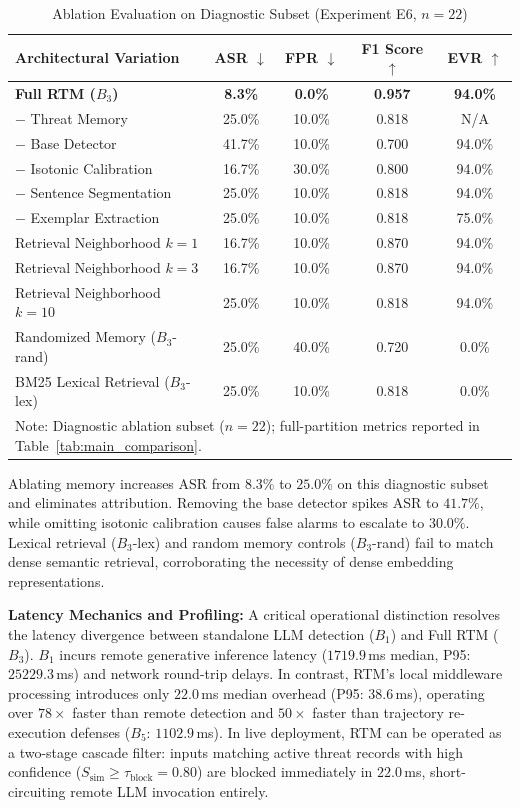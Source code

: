 \documentclass[conference]{IEEEtran}
\begin{document}
\begin{table}[t]
\centering
\caption{Ablation Evaluation on Diagnostic Subset (Experiment E6, $n=22$)}
\label{tab:ablation}
\begin{tabular}{l c c c c}
\hline
\textbf{Architectural Variation} & \textbf{ASR} $\downarrow$ & \textbf{FPR} $\downarrow$ & \textbf{F1 Score} $\uparrow$ & \textbf{EVR} $\uparrow$ \\
\hline
\textbf{Full RTM ($B_3$)} & \textbf{8.3\%} & \textbf{0.0\%} & \textbf{0.957} & \textbf{94.0\%} \\
$-$ Threat Memory & 25.0\% & 10.0\% & 0.818 & N/A \\
$-$ Base Detector & 41.7\% & 10.0\% & 0.700 & 94.0\% \\
$-$ Isotonic Calibration & 16.7\% & 30.0\% & 0.800 & 94.0\% \\
$-$ Sentence Segmentation & 25.0\% & 10.0\% & 0.818 & 94.0\% \\
$-$ Exemplar Extraction & 25.0\% & 10.0\% & 0.818 & 75.0\% \\
Retrieval Neighborhood $k=1$ & 16.7\% & 10.0\% & 0.870 & 94.0\% \\
Retrieval Neighborhood $k=3$ & 16.7\% & 10.0\% & 0.870 & 94.0\% \\
Retrieval Neighborhood $k=10$ & 25.0\% & 10.0\% & 0.818 & 94.0\% \\
Randomized Memory ($B_3$-rand) & 25.0\% & 40.0\% & 0.720 & 0.0\% \\
BM25 Lexical Retrieval ($B_3$-lex) & 25.0\% & 10.0\% & 0.818 & 0.0\% \\
\hline
\multicolumn{5}{l}{\small Note: Diagnostic ablation subset ($n=22$); full-partition metrics reported in Table~\ref{tab:main_comparison}.} \\
\hline
\end{tabular}
\end{table}

Ablating memory increases ASR from $8.3\%$ to $25.0\%$ on this diagnostic subset and eliminates attribution. Removing the base detector spikes ASR to $41.7\%$, while omitting isotonic calibration causes false alarms to escalate to $30.0\%$. Lexical retrieval ($B_3$-lex) and random memory controls ($B_3$-rand) fail to match dense semantic retrieval, corroborating the necessity of dense embedding representations.

\noindent\textbf{Latency Mechanics and Profiling:}
A critical operational distinction resolves the latency divergence between standalone LLM detection ($B_1$) and Full RTM ($B_3$). $B_1$ incurs remote generative inference latency ($1719.9$\,ms median, P95: $25229.3$\,ms) and network round-trip delays. In contrast, RTM's local middleware processing introduces only $22.0$\,ms median overhead (P95: $38.6$\,ms), operating over $78\times$ faster than remote detection and $50\times$ faster than trajectory re-execution defenses ($B_5$: $1102.9$\,ms). In live deployment, RTM can be operated as a two-stage cascade filter: inputs matching active threat records with high confidence ($S_{\text{sim}} \ge \tau_{\text{block}} = 0.80$) are blocked immediately in $22.0$\,ms, short-circuiting remote LLM invocation entirely.
\end{document}
